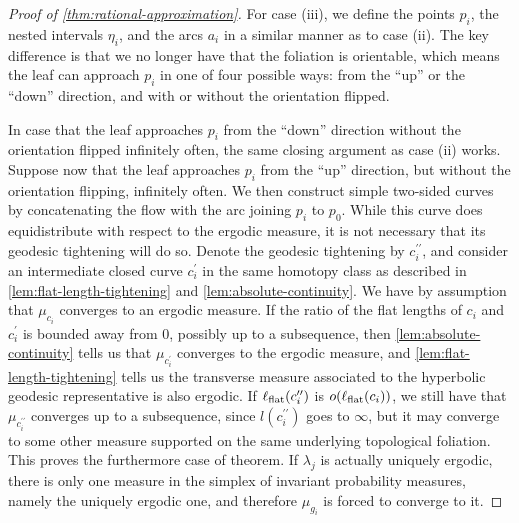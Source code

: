 \documentclass[12pt, reqno]{amsart}
\begin{document}
\begin{proof}[Proof of \autoref{thm:rational-approximation}]
  For case (iii), we define the points $p_i$, the nested intervals $\eta_i$, and the arcs $a_i$ in a similar manner as to case (ii).
  The key difference is that we no longer have that the foliation is orientable, which means the leaf can approach $p_i$ in one of four possible ways: from the ``up'' or the ``down'' direction, and with or without the orientation flipped.

  In case that the leaf approaches $p_i$ from the ``down'' direction without the orientation flipped infinitely often, the same closing argument as case (ii) works.
  Suppose now that the leaf approaches $p_i$ from the ``up'' direction, but without the orientation flipping, infinitely often.
  We then construct simple two-sided curves by concatenating the flow with the arc joining $p_i$ to $p_0$.
  While this curve does equidistribute with respect to the ergodic measure, it is not necessary that its geodesic tightening will do so.
  Denote the geodesic tightening by $c_i^{\prime \prime}$, and consider an intermediate closed curve $c_i^{\prime}$ in the same homotopy class as described in \autoref{lem:flat-length-tightening} and \autoref{lem:absolute-continuity}.
  We have by assumption that $\mu_{c_i}$ converges to an ergodic measure.
  If the ratio of the flat lengths of $c_i$ and $c_i^{\prime}$ is bounded away from $0$, possibly up to a subsequence, then \autoref{lem:absolute-continuity} tells us that $\mu_{c_i^{\prime}}$ converges to the ergodic measure, and \autoref{lem:flat-length-tightening} tells us the transverse measure associated to the hyperbolic geodesic representative is also ergodic.
  If $\ell_{\mathrm{flat}}(c_i^{\prime \prime})$ is $o(\ell_{\mathrm{flat}}(c_i))$, we still have that $\mu_{c_i^{\prime \prime}}$ converges up to a subsequence, since $l(c_i^{\prime \prime})$ goes to $\infty$, but it may converge to some other measure supported on the same underlying topological foliation.
  This proves the furthermore case of theorem.
  If $\lambda_j$ is actually uniquely ergodic, there is only one measure in the simplex of invariant probability measures, namely the uniquely ergodic one, and therefore $\mu_{g_i}$ is forced to converge to it.


\end{proof}
\end{document}
